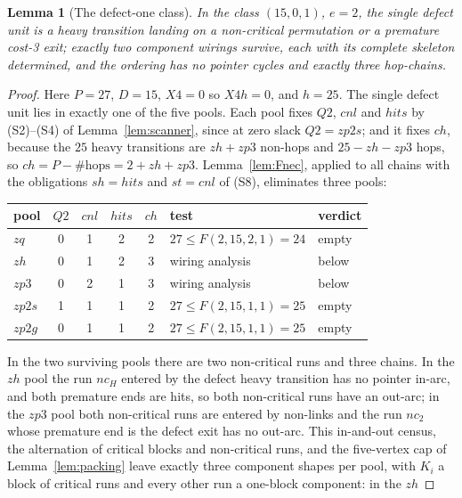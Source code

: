 \documentclass[10pt]{article}
\newtheorem{lemma}[theorem]{Lemma}
\theoremstyle{remark}
\theoremstyle{plain}
\newcommand{\NCh}{\mathit{ch}}
\begin{document}
\begin{lemma}[The defect-one class]\label{lem:zclass}
In the class $(15,0,1)$, $e=2$, the single defect unit is a heavy
transition landing on a non-critical permutation or a premature cost-3
exit; exactly two component wirings survive, each with its complete
skeleton determined, and the ordering has no pointer cycles and exactly
three hop-chains.
\end{lemma}

\begin{proof}
Here $P=27$, $D=15$, $X4=0$ so $X4h=0$, and $h=25$.  The single defect
unit lies in exactly one of the five pools.  Each pool fixes $Q2$,
$\mathit{cnl}$ and $\mathit{hits}$ by (S2)--(S4) of
Lemma~\ref{lem:scanner}, since at zero slack $Q2=zp2s$; and it fixes
$\NCh$, because the $25$ heavy
transitions are $zh+zp3$ non-hops and $25-zh-zp3$ hops, so
$\NCh=P-\#\text{hops}=2+zh+zp3$.  Lemma~\ref{lem:Fnec}, applied to all
chains with the obligations $\mathit{sh}=\mathit{hits}$ and
$\mathit{st}=\mathit{cnl}$ of (S8), eliminates three pools:
\begin{center}\small
\begin{tabular}{@{}l ccc c l l@{}}
\toprule
pool & $Q2$ & $\mathit{cnl}$ & $\mathit{hits}$ & $\NCh$ & test &
verdict\\
\midrule
$zq$    & 0 & 1 & 2 & 2 & $27\le F(2,15,2,1)=24$ & empty\\
$zh$    & 0 & 1 & 2 & 3 & wiring analysis & below\\
$zp3$   & 0 & 2 & 1 & 3 & wiring analysis & below\\
$zp2s$  & 1 & 1 & 1 & 2 & $27\le F(2,15,1,1)=25$ & empty\\
$zp2g$  & 0 & 1 & 1 & 2 & $27\le F(2,15,1,1)=25$ & empty\\
\bottomrule
\end{tabular}
\end{center}
In the two surviving pools there are two non-critical runs and three
chains.  In the $zh$ pool the run $\mathit{nc}_H$ entered by the defect
heavy transition has no pointer in-arc, and both premature ends are
hits, so both non-critical runs have an out-arc; in the $zp3$ pool both
non-critical runs are entered by non-links and the run $\mathit{nc}_2$
whose premature end is the defect exit has no out-arc.  This in-and-out census, the alternation of critical blocks and
non-critical runs, and the five-vertex cap of Lemma~\ref{lem:packing}
leave exactly three component shapes per pool, with $K_i$ a block of
critical runs and every other run a one-block component: in the $zh$

\end{proof}
\end{document}
